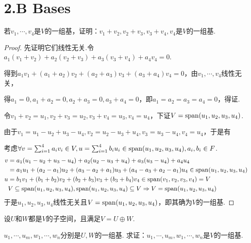 \section{2.B Bases}

\begin{problem}[6]\label{2.B.6}
    若\(v_1,\cdots,v_4\)是\(V\)的一组基，证明：\(v_1+v_2,v_2+v_3,v_3+v_4,v_4\)是\(V\)的一组基.
\end{problem}

\begin{proof}
    先证明它们线性无关.令\(a_1(v_1+v_2)+a_2(v_2+v_3)+a_3(v_3+v_4)+a_4v_4=0\).

    得到\(a_1v_1+(a_1+a_2)v_2+(a_2+a_3)v_3+(a_3+a_4)v_4=0\)，由\(v_1,\cdots,v_4\)线性无关，
    
    得\(a_1=0,a_1+a_2=0,a_2+a_3=0,a_3+a_4=0\)，即\(a_1=a_2=a_3=a_4=0\)，得证.
    
    令\(v_1+v_2=u_1,v_2+v_3=u_2,v_3+v_4=u_3,v_4=u_4\)，下证\(V=\operatorname{span}(u_1,u_2,u_3,u_4)\).
    
    由于\(v_1=u_1-u_2+u_3-u_4,v_2=u_2-u_3+u_4,v_3=u_3-u_4,v_4=u_4\)，于是有
    
    考虑\(\forall v=\sum_{i=1}^4 a_iv_i \in V,u=\sum_{i=1}^4 b_iu_i \in \operatorname{span}(u_1,u_2,u_3,u_4),a_i,b_i \in F\).
    \begin{align*}
        v&=a_1(u_1-u_2+u_3-u_4)+a_2(u_2-u_3+u_4)+a_3(u_3-u_4)+a_4u_4 \\
            &=a_1u_1+(a_2-a_1)u_2+(a_3-a_2+a_1)u_3+(a_4-a_3+a_2-a_1)u_4 \in \operatorname{span}(u_1,u_2,u_3,u_4) \\
        u&=b_1v_1+(b_1+b_2)v_2+(b_2+b_3)v_3+(b_3+b_4)v_4 \in \operatorname{span}(v_1,v_2,v_3,v_4)=V \\
            & V \subseteq \operatorname{span}(u_1,u_2,u_3,u_4),\operatorname{span}(u_1,u_2,u_3,u_4)\subseteq V 
            \Rightarrow V=\operatorname{span}(u_1,u_2,u_3,u_4)
    \end{align*}
    于是\(u_1,u_2,u_3,u_4\)线性无关且\(V=\operatorname{span}(u_1,u_2,u_3,u_4)\)，即其确为\(V\)的一组基.    
\end{proof}

\begin{problem}[8]\label{2.B.8}
    设\(U\)和\(W\)都是\(V\)的子空间，且满足\(V=U \oplus W\).

    \(u_1,\cdots,u_m,w_1,\cdots,w_n\)分别是\(U,W\)的一组基.
    求证：\(u_1,\cdots,u_m,w_1,\cdots,w_n\)是\(V\)的一组基.
\end{problem}

